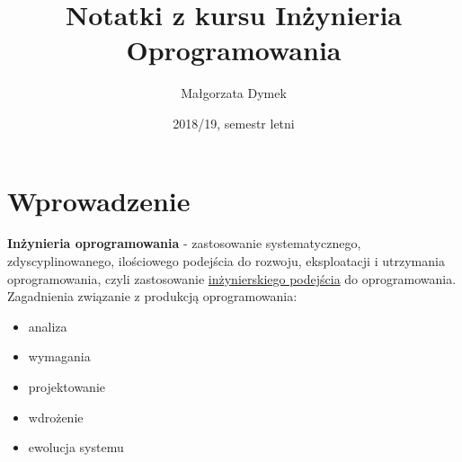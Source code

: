 \documentclass[a4paper]{article}
\title{Notatki z kursu Inżynieria Oprogramowania}
\author{Małgorzata Dymek}
\date{2018/19, semestr letni}
\begin{document}
    \maketitle


    \section{Wprowadzenie}
    \textbf{Inżynieria oprogramowania} - zastosowanie systematycznego, zdyscyplinowanego, ilościowego podejścia do rozwoju, eksploatacji i utrzymania
    oprogramowania, czyli zastosowanie \underline{inżynierskiego podejścia} do oprogramowania.
    Zagadnienia związanie z produkcją oprogramowania:
    \begin{itemize}
        \item analiza
        \item wymagania
        \item projektowanie
        \item wdrożenie
        \item ewolucja systemu
    \end{itemize}
\end{document}
